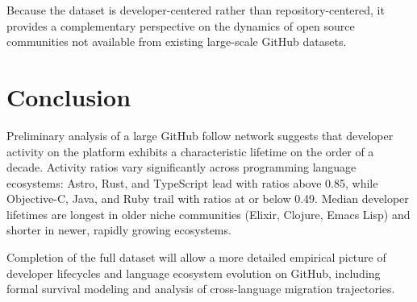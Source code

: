 \documentclass[12pt,a4paper]{article}
\begin{document}
Because the dataset is developer-centered rather than repository-centered, it
provides a complementary perspective on the dynamics of open source communities
not available from existing large-scale GitHub datasets.

\section{Conclusion}

Preliminary analysis of a large GitHub follow network suggests that developer
activity on the platform exhibits a characteristic lifetime on the order of a
decade. Activity ratios vary significantly across programming language
ecosystems: Astro, Rust, and TypeScript lead with ratios above 0.85, while
Objective-C, Java, and Ruby trail with ratios at or below 0.49. Median developer
lifetimes are longest in older niche communities (Elixir, Clojure, Emacs Lisp)
and shorter in newer, rapidly growing ecosystems.

Completion of the full dataset will allow a more detailed empirical picture of
developer lifecycles and language ecosystem evolution on GitHub, including formal
survival modeling and analysis of cross-language migration trajectories.
\end{document}
